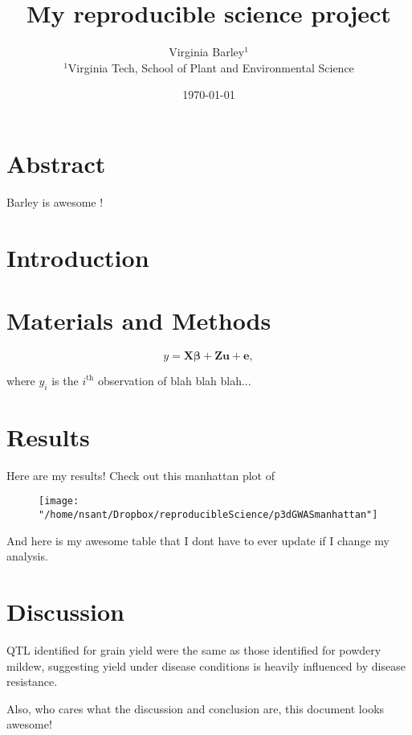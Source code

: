 \documentclass[12pt]{article} %
\title{My reproducible science project}
\author{Virginia Barley$^1$\\
$^1$Virginia Tech, School of Plant and Environmental Science
}
\date{\today} %
\begin{document}
\maketitle %

\section{Abstract} %

Barley is awesome \parencite{barley23}! 


\section{Introduction} 

\lipsum[1-3]

\section{Materials and Methods} 

\lipsum[4-5]

\begin{equation}
	y = \mathbf{X}\boldsymbol{\beta} + \mathbf{Zu} + \mathbf{e},
\end{equation}

\noindent where $y_i$ is the $i^\text{th}$ observation of blah blah blah...

\section{Results} 

\lipsum[6-7]
Here are my results! Check out this manhattan plot of 

\begin{figure}
\label{manPM}
\texttt{[image: "/home/nsant/Dropbox/reproducibleScience/p3dGWASmanhattan"]}
\end{figure}

\lipsum[8-8]

And here is my awesome table that I dont have to ever update if I change my analysis.




\section{Discussion} 

QTL identified for grain yield were the same as those identified for powdery mildew, suggesting yield under disease conditions is heavily influenced by disease resistance. 

Also, who cares what the discussion and conclusion are, this document looks awesome!

\printbibliography
\end{document}
